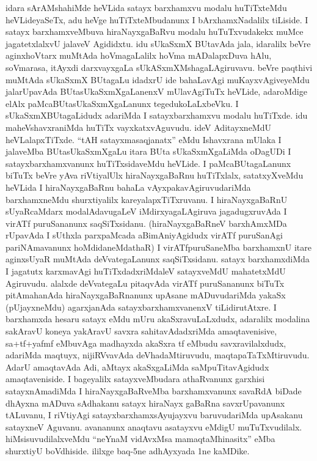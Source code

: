 \begin{artha}
idara sArAMsha\ndash  hiMde heVLida satayx barxhamxvu modalu huTiTxteMdu heVLideyaSeTx, adu heVge huTiTxteMbudanunx I bArxhamxNadalilx tiLiside. I satayx barxhamxveMbuva hiraNayxgaBaRvu modalu huTuTxvudakekx muMce jagatetxlalxvU jalaveV Agididxtu. idu sUkaSxmX BUtavAda jala, idaralilx beVre aginxhoVtarx muMtAda hoVmagaLalilx hoVma mADalapxDuva hAlu, soVmarasa, itAyxdi darxvayxgaLa sUkASxmXMshagaLAgiruvavu. beVre paqthivi muMtAda sUkaSxmX BUtagaLu idadxrU ide bahaLavAgi muKayxvAgiveyeMdu jalarUpavAda BUtasUkaSxmXgaLanenxV mUlavAgiTuTx heVLide, adaroMdige elAlx paMcaBUtasUkaSxmXgaLanunx tegedukoLaLxbeVku. I sUkaSxmXBUtagaLidudx adariMda I satayxbarxhamxvu modalu huTiTxde. idu maheVshavxraniMda huTiTx vayxkatxvAguvudu. ideV AditayxneMdU heVLalapxTiTxde. ``tAH satayxmasaqjanatx'' eMdu Ishavxrana mUlaka I jalaveMba BUtasUkaSxmXgaLu itara BUta sUkaSxmXgaLiMda oDagUDi I satayxbarxhamxvanunx huTiTxsidaveMdu heVLide. I paMcaBUtagaLanunx biTuTx beVre yAva riVtiyalUlx hiraNayxgaBaRnu huTiTxlalx, satatxyXveMdu heVLida I hiraNayxgaBaRnu bahaLa vAyxpakavAgiruvudariMda barxhamxneMdu shurxtiyalilx kareyalapxTiTxruvanu. I hiraNayxgaBaRnU sUyaRcaMdarx modalAdavugaLeV iMdirxyagaLAgiruva jagadugxruvAda I virATf puruSananunx saqSiTxsidanu. (hiraNayxgaBaRneV barxhAmxMDa rUpavAda I sUthxla parxpaMcada aBimAniyAgidudx virATf puruSanAgi pariNAmavanunx hoMdidaneMdathaR) I virATfpuruSaneMba barxhamxnU itare aginxsUyaR muMtAda deVvategaLanunx saqSiTxsidanu. satayx barxhamxdiMda I jagatutx karxmavAgi huTiTxdadxriMdaleV satayxveMdU mahatetxMdU Agiruvudu. alalxde deVvategaLu pitaqvAda virATf puruSananunx biTuTx pitAmahanAda hiraNayxgaBaRnanunx upAsane mADuvudariMda yakaSx (pUjayxneMdu) agarxjanAda satayxbarxhamxvanenxV tiLidirutAtxre. I barxhamxda hesaru satayx eMdu mUru akaSxravuLaLxdudx, adaralilx modalina sakAravU koneya yakAravU savxra sahitavAdadxriMda amaqtavenisive, sa+tf+yafmf eMbuvAga madhayxda akaSxra tf eMbudu savxravilalxdudx, adariMda maqtuyx, nijiRVvavAda deVhadaMtiruvudu, maqtapaTaTxMtiruvudu. AdarU amaqtavAda Adi, aMtayx akaSxgaLiMda saMpuTitavAgidudx amaqtaveniside. I bageyalilx satayxveMbudara athaRvanunx garxhisi satayxnAmadiMda I hiraNayxgaBaRveMba barxhamxvanunx savaRdA biDade dhAyxna mADuva sAdhakanu satayx hiraNayx gaBaRna savxrUpavanunx tALuvanu, I riVtiyAgi satayxbarxhamxsAyujayxvu baruvudariMda upAsakanu satayxneV Aguvanu. avananunx anaqtavu asatayxvu eMdigU muTuTxvudilalx. hiMsisuvudilalxveMdu ``neYnaM vidAvxMsa mamaqtaMhinasitx'' eMba shurxtiyU boVdhiside. ililxge baq-5ne adhAyxyada 1ne kaMDike.
\end{artha}

